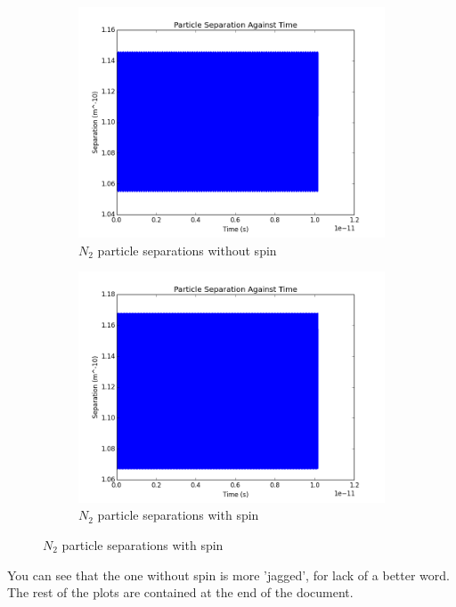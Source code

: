 \documentclass[12pt]{article}
\begin{document}
	\begin{figure}[H]
		\centering
		\begin{subfigure}{0.45\textwidth}
			\includegraphics[width=\textwidth]{n2nospinlong}
			\caption*{$N_2$ particle separations without spin}
		\end{subfigure}
		\begin{subfigure}{0.45\textwidth}
			\includegraphics[width=\textwidth]{n2spinlong}
			\caption*{$N_2$ particle separations with spin}
		\end{subfigure}
	\end{figure}
	
You can see that the one without spin is more 'jagged', for lack of a better word.
The rest of the plots are contained at the end of the document.
\end{document}
